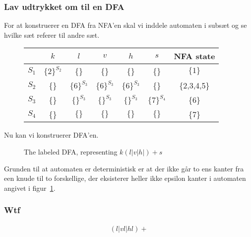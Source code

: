 \subsubsection{Lav udtrykket om til en DFA}
For at konstruerer en DFA fra NFA'en skal vi inddele automaten i subsæt og se hvilke sæt referer til andre sæt.
\begin{figure}[!ht]
    \centering
    \begin{tabular}{c|cccccc}
            &$k$&$l$&$v$&$h$&$s$&NFA state\\\hline
        $S_1$&$\{2\}^{S_2}$&\{\}&\{\}& \{\}&\{\}& $\{1\}$\\
        $S_2$&\{\}&$\{6\}^{S_3}$&$\{6\}^{S_3}$&$\{6\}^{S_3}$&\{\}&\{2,3,4,5\}\\
        $S_3$&\{\}&$\{\}^{S_3}$&$\{\}^{S_3}$&$\{\}^{S_3}$&$\{7\}^{S_4}$&\{6\}\\
        $S_4$&\{\}&$\{\}$&$\{\}$&$\{\}$&$\{\}$&\{7\}
    \end{tabular}
\end{figure}
Nu kan vi konstruerer DFA'en.
\begin{figure}[!ht]
    \centering
    \caption{The labeled DFA, representing $k(l|v|h|)+s$}\label{fig:2016:examfigdfa}
\end{figure}
Grunden til at automaten er deterministisk er at der ikke går to ens kanter fra een knude til to forskellige, der eksisterer heller ikke epsilon kanter i automaten angivet i figur~\ref{fig:2016:examfigdfa}.
\subsubsection{Wtf}
\begin{align*}
    (l|vl|hl)+
\end{align*}
